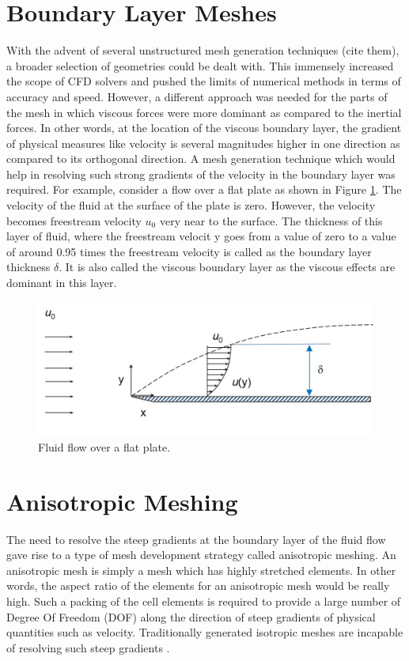 \section{Boundary Layer Meshes}
\label{sec-boundaryLayerMesh}

With the advent of several unstructured mesh generation techniques (cite them), a broader selection of geometries could be dealt with. This immensely increased the scope of CFD solvers and pushed the limits of numerical methods in terms of accuracy and speed. However, a different approach was needed for the parts of the mesh in which viscous forces were more dominant as compared to the inertial forces. In other words, at the location of the viscous boundary layer, the gradient of physical measures like velocity is several magnitudes higher in one direction as compared to its orthogonal direction. A mesh generation technique which would help in resolving such strong gradients of the velocity in the boundary layer was required. For example, consider a flow over a flat plate as shown in Figure \ref{fig-boundaryLayer}. The velocity of the fluid at the surface of the plate is zero. However, the velocity becomes freestream velocity $u_0$ very near to the surface. The thickness of this layer of fluid, where the freestream velocit	y goes from a value of zero to a value of around 0.95 times the freestream velocity is called as the boundary layer thickness $\delta$. It is also called the viscous boundary layer as the viscous effects are dominant in this layer.

\begin{figure}
  \centering	
  \includegraphics[width=0.8\linewidth]{img/intro/boundaryLayer.jpg}
  \caption{Fluid flow over a flat plate.}
  \label{fig-boundaryLayer}
\end{figure}

\section{Anisotropic Meshing}

The need to resolve the steep gradients at the boundary layer of the fluid flow gave rise to a type of mesh development strategy called anisotropic meshing. An anisotropic mesh is simply a mesh which has highly stretched elements. In other words, the aspect ratio of the elements for an anisotropic mesh would be really high. Such a packing of the cell elements is required to provide a large number of Degree Of Freedom (DOF) along the direction of steep gradients of physical quantities such as velocity. Traditionally generated isotropic meshes are incapable of resolving such steep gradients \cite{frey2005anisotropic}. 

